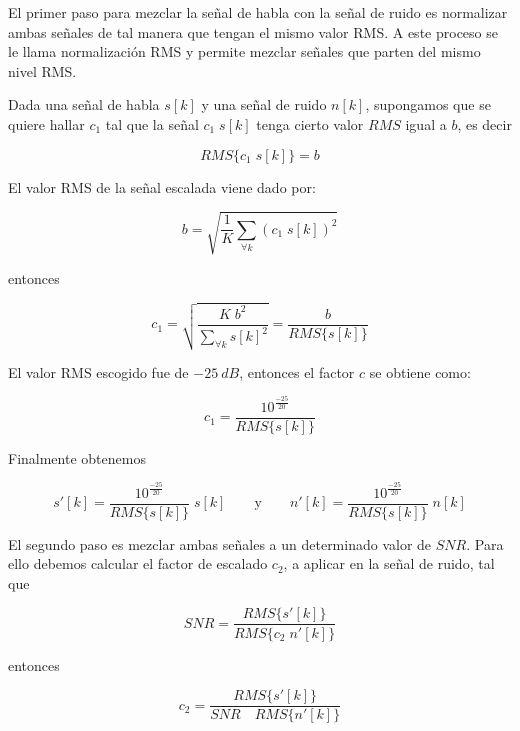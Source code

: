 El primer paso para mezclar la señal de habla con la señal de ruido es normalizar ambas señales de tal manera que tengan el mismo valor RMS. A este proceso se le llama normalización RMS y permite mezclar señales que parten del mismo nivel RMS.

Dada una señal de habla $s[k]$ y una señal de ruido $n[k]$, supongamos que se quiere hallar $c_1$ tal que la señal $c_1 \; s[k]$ tenga cierto valor $RMS$ igual a $b$, es decir 

\begin{equation*}
	RMS\{c_1 \; s[k]\} = b
\end{equation*}

El valor RMS de la señal escalada viene dado por:

\begin{equation*}
	b = \sqrt{\frac{1}{K} \sum_{\forall k} (c_1 \; s[k])^2}
\end{equation*}

entonces

\begin{equation*}
	c_1 = \sqrt{\frac{K \; b^2}{\sum_{\forall k} s[k]^2}} = \frac{b}{RMS\{s[k]\}}
\end{equation*}

El valor RMS escogido fue de $\SI{-25}{dB}$, entonces el factor $c$ se obtiene como:

\begin{equation*}
	c_1 = \frac{10^{\frac{-25}{20}}}{RMS\{s[k]\}}
\end{equation*}

Finalmente obtenemos

\begin{equation*}
	s'[k] = \frac{10^{\frac{-25}{20}}}{RMS\{s[k]\}} \; s[k] \qquad \text{y} \qquad n'[k] = \frac{10^{\frac{-25}{20}}}{RMS\{s[k]\}} \; n[k]
\end{equation*}

El segundo paso es mezclar ambas señales a un determinado valor de $SNR$. Para ello debemos calcular el factor de escalado $c_2$, a aplicar en la señal de ruido, tal que

\begin{equation*}
	SNR = \frac{RMS\{s'[k]\}}{RMS\{c_2 \; n'[k]\}}
\end{equation*}

entonces

\begin{equation*}
	c_2 = \frac{RMS\{s'[k]\}}{SNR \quad RMS\{n'[k]\}}
\end{equation*}


